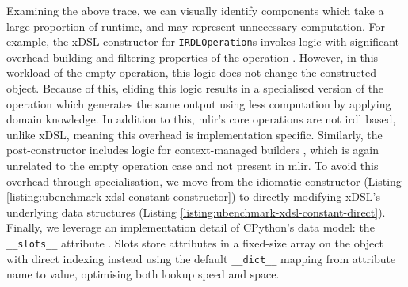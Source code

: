 Examining the above trace, we can visually identify components which take a large proportion of runtime, and may represent unnecessary computation.
For example, the xDSL constructor for \texttt{IRDLOperation}s invokes logic with significant overhead building and filtering properties of the operation . However, in this workload of the empty operation, this logic does not change the constructed object. Because of this, eliding this logic results in a specialised version of the operation which generates the same output using less computation by applying domain knowledge.
In addition to this, \ac{mlir}'s core operations are not \ac{irdl} based, unlike xDSL, meaning this overhead is implementation specific.
Similarly, the post-constructor includes logic for context-managed builders , which is again unrelated to the empty operation case and not present in \ac{mlir}.
To avoid this overhead through specialisation, we move from the idiomatic constructor (Listing \ref{listing:ubenchmark-xdsl-constant-constructor}) to directly modifying xDSL's underlying data structures (Listing \ref{listing:ubenchmark-xdsl-constant-direct}).
Finally, we leverage an implementation detail of CPython's data model: the \texttt{__slots__} attribute \cite{pythonsoftwarefoundation3324DataModel}. Slots store attributes in a fixed-size array on the object with direct indexing instead using the default \texttt{__dict__} mapping from attribute name to value, optimising both lookup speed and space.

